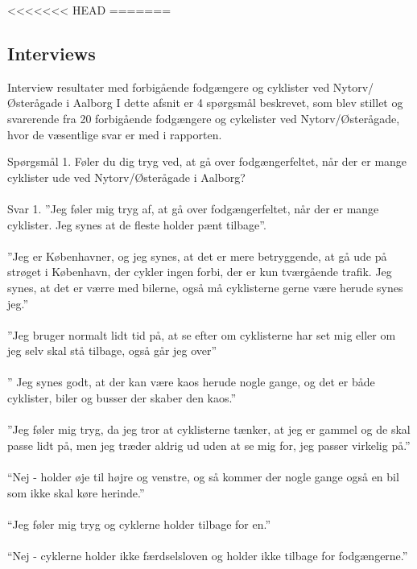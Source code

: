 \appendix
\label{appendix_start}


<<<<<<< HEAD
=======
\begin{appendics}
  \chapter{Interviews}
  \label{chap:interviews}
Interview resultater med forbigående fodgængere og cyklister ved Nytorv/Østerågade i Aalborg I dette afsnit er 4 spørgsmål beskrevet, som blev stillet og svarerende fra 20 forbigående fodgængere og cykelister ved Nytorv/Østerågade, hvor de væsentlige svar er med i rapporten.

  Spørgsmål 1.
  Føler du dig tryg ved, at gå over fodgængerfeltet, når der er mange cyklister ude ved Nytorv/Østerågade i Aalborg?
\\\\
  Svar 1.
  ”Jeg føler mig tryg af, at gå over fodgængerfeltet, når der er mange cyklister. Jeg synes at de fleste holder pænt tilbage”.
\\\\
  ”Jeg er Københavner, og jeg synes, at det er mere betryggende, at gå ude på strøget i København, der cykler ingen forbi, der er kun tværgående trafik. Jeg synes, at det er værre med bilerne, også må cyklisterne gerne være herude synes jeg.”
\\\\
  ”Jeg bruger normalt lidt tid på, at se efter om cyklisterne har set mig eller om jeg selv skal stå tilbage, også går jeg over”
\\\\
  ” Jeg synes godt, at der kan være kaos herude nogle gange, og det er både cyklister, biler og busser der skaber den kaos.”
\\\\
  ”Jeg føler mig tryg, da jeg tror at cyklisterne tænker, at jeg er gammel og de skal passe lidt på, men jeg træder aldrig ud uden at se mig for, jeg passer virkelig på.”
\\\\
  “Nej - holder øje til højre og venstre, og så kommer der nogle gange også en bil som ikke skal køre herinde.”
\\\\
  “Jeg føler mig tryg og cyklerne holder tilbage for en.”
\\\\
  “Nej - cyklerne holder ikke færdselsloven og holder ikke tilbage for fodgængerne.”
\\\\

\end{appendics}

